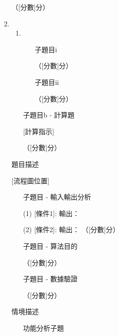 \documentclass[12pt,a4paper]{article}
\newcommand{\answerline}[1]{\underline{\hspace{#1}}}
\begin{document}
\begin{enumerate}
（[分數]分）

\item \begin{enumerate}[label=(\alph*)]
\item \begin{enumerate}[label=(\roman*)]
\item [子題目i]

\answerline{15cm} （[分數]分）

\item [子題目ii]

\answerline{15cm} （[分數]分）

\end{enumerate}

\item [子題目b - 計算題]

[計算指示]

\answerline{15cm}

\answerline{15cm}

\answerline{15cm} （[分數]分）

\end{enumerate}

\item [題目描述]

[流程圖位置]

\begin{enumerate}[label=(\alph*)]
\item [子題目 - 輸入輸出分析]

(1) [條件1]: 輸出： \answerline{2cm}

(2) [條件2]: 輸出： \answerline{2cm} （[分數]分）

\item [子題目 - 算法目的]

\answerline{15cm}

\answerline{15cm} （[分數]分）

\item [子題目 - 數據驗證]

\answerline{15cm}

\answerline{15cm} （[分數]分）

\end{enumerate}

\item [情境描述]

\begin{enumerate}[label=(\alph*)]
\item [功能分析子題]


\end{enumerate}
\end{enumerate}
\end{document}

